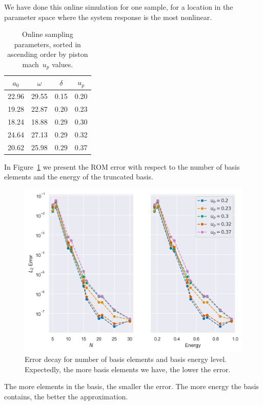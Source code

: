 \documentclass[../../thesis.tex]{subfiles}
\begin{document}
We have done this online simulation for one sample, 
for a location in the parameter space where the system response is the most nonlinear.
\begin{table}[h]
    \centering
    \caption{Online sampling parameters, 
    sorted in ascending order by piston mach~$u_p$ values.}
    \begin{tabular}{cccc}
    \toprule
        $a_0$ & $\omega$ & $\delta$ & $u_p$
        \\ \midrule
        22.96 &   29.55 & 0.15 &           0.20 \\
        19.28 &   22.87 & 0.20 &           0.23 \\
        18.24 &   18.88 & 0.29 &           0.30 \\
        24.64 &   27.13 & 0.29 &           0.32 \\
        20.62 &   25.98 & 0.29 &           0.37
        \\ \bottomrule
    \end{tabular}
\end{table}

In Figure~\ref{fig:error_decay} we present the ROM error with respect to 
the number of basis elements and the energy of the truncated basis.
\begin{figure}[h]
    \centering
    \includegraphics[width=\columnwidth]{research_project/piston/figures/rb_certification/error_decay.png}
    \caption{Error decay for number of basis elements and basis energy level.
    Expectedly, the more basis elements we have, the lower the error.}
    \label{fig:error_decay}
\end{figure}
The more elements in the basis, the smaller the error.
The more energy the basis contains, the better the approximation.
\end{document}
